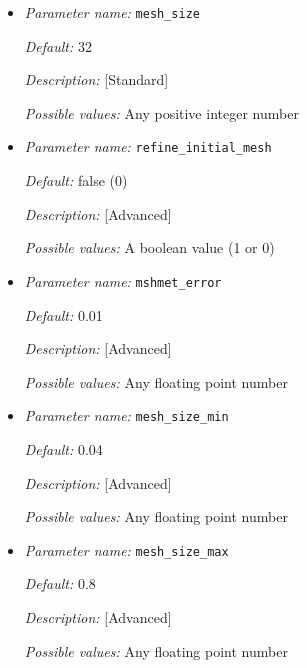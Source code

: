 \begin{itemize}
{\it Default:} 4.0

{\it Description:} [Standard] 

{\it Possible values:} Any positive floating point number 


\item {\it Parameter name:} {\tt mesh\_size}
\label{parameters:mesh_size}


{\it Default:} 32

{\it Description:} [Standard] 

{\it Possible values:} Any positive integer number 


\item {\it Parameter name:} {\tt refine\_initial\_mesh}
\label{parameters:refine_initial_mesh}


{\it Default:} false (0)

{\it Description:} [Advanced] 

{\it Possible values:} A boolean value (1 or 0)


\item {\it Parameter name:} {\tt mshmet\_error}
\label{parameters:mshmet_error}


{\it Default:} 0.01

{\it Description:} [Advanced] 

{\it Possible values:} Any floating point number


\item {\it Parameter name:} {\tt mesh\_size\_min}
\label{parameters:mesh_size_min}


{\it Default:} 0.04

{\it Description:} [Advanced] 

{\it Possible values:} Any floating point number


\item {\it Parameter name:} {\tt mesh\_size\_max}
\label{parameters:mesh_size_max}


{\it Default:} 0.8

{\it Description:} [Advanced] 

{\it Possible values:} Any floating point number

\end{itemize}



